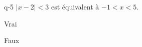 \begin{truefalse}{q-5}
$|x-2|<3$ est équivalent à $-1 < x < 5$.
\item* Vrai
\item Faux
\end{truefalse}

